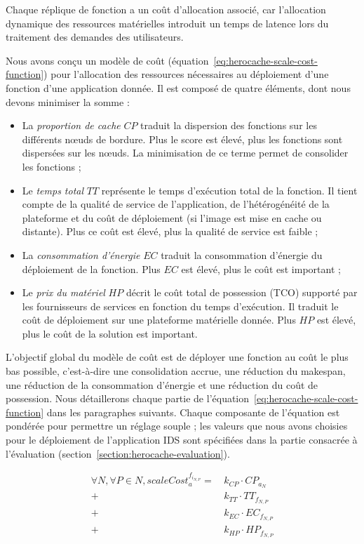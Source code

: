 Chaque réplique de fonction a un coût d'allocation associé, car l'allocation dynamique des ressources matérielles introduit un temps de latence lors du traitement des demandes des utilisateurs. 

Nous avons conçu un modèle de coût (équation~\ref{eq:herocache-scale-cost-function}) pour l'allocation des ressources nécessaires au déploiement d'une fonction d'une application donnée. Il est composé de quatre éléments, dont nous devons minimiser la somme :

\begin{itemize}
    \item La \textit{proportion de cache} $CP$ traduit la dispersion des fonctions sur les différents nœuds de bordure. Plus le score est élevé, plus les fonctions sont dispersées sur les nœuds. La minimisation de ce terme permet de consolider les fonctions ;
    \item Le \textit{temps total} $TT$ représente le temps d'exécution total de la fonction. Il tient compte de la qualité de service de l'application, de l'hétérogénéité de la plateforme et du coût de déploiement (si l'image est mise en cache ou distante). Plus ce coût est élevé, plus la qualité de service est faible ;
    \item La \textit{consommation d'énergie} $EC$ traduit la consommation d'énergie du déploiement de la fonction. Plus $EC$ est élevé, plus le coût est important ;
    \item Le \textit{prix du matériel} $HP$ décrit le coût total de possession (TCO) supporté par les fournisseurs de services en fonction du temps d'exécution. Il traduit le coût de déploiement sur une plateforme matérielle donnée. Plus $HP$ est élevé, plus le coût de la solution est important.
\end{itemize}

L'objectif global du modèle de coût est de déployer une fonction au coût le plus bas possible, c'est-à-dire une consolidation accrue, une réduction du makespan, une réduction de la consommation d'énergie et une réduction du coût de possession. Nous détaillerons chaque partie de l'équation~\ref{eq:herocache-scale-cost-function} dans les paragraphes suivants. Chaque composante de l'équation est pondérée pour permettre un réglage souple ; les valeurs que nous avons choisies pour le déploiement de l'application IDS sont spécifiées dans la partie consacrée à l'évaluation (section~\ref{section:herocache-evaluation}).

\begin{equation}
\begin{split}
 \forall N, \forall P \in N, scaleCost^{{f}_{{i}_{N, P}}}_{a} = \,   &k_{CP} \cdot {CP}_{{a}_{N}}    \\
    + &k_{TT} \cdot {TT}_{{f}_{N, P}} \\
    + &k_{EC} \cdot {EC}_{{f}_{N, P}} \\
    + &k_{HP} \cdot {HP}_{{f}_{N, P}}
\end{split}
\label{eq:herocache-scale-cost-function}
\end{equation}

